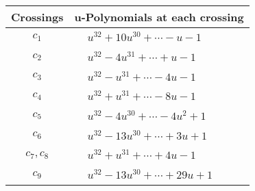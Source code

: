 \documentclass[1p]{elsarticle_modified}
\theoremstyle{definition}
\begin{document}
\begin{tabular}{m{50pt}|m{274pt}}
Crossings & \hspace{64pt}u-Polynomials at each crossing \\
\hline $$\begin{aligned}c_{1}\end{aligned}$$&$\begin{aligned}
&u^{32}+10 u^{30}+\cdots- u-1
\end{aligned}$\\
\hline $$\begin{aligned}c_{2}\end{aligned}$$&$\begin{aligned}
&u^{32}-4 u^{31}+\cdots+u-1
\end{aligned}$\\
\hline $$\begin{aligned}c_{3}\end{aligned}$$&$\begin{aligned}
&u^{32}- u^{31}+\cdots-4 u-1
\end{aligned}$\\
\hline $$\begin{aligned}c_{4}\end{aligned}$$&$\begin{aligned}
&u^{32}+u^{31}+\cdots-8 u-1
\end{aligned}$\\
\hline $$\begin{aligned}c_{5}\end{aligned}$$&$\begin{aligned}
&u^{32}-4 u^{30}+\cdots-4 u^2+1
\end{aligned}$\\
\hline $$\begin{aligned}c_{6}\end{aligned}$$&$\begin{aligned}
&u^{32}-13 u^{30}+\cdots+3 u+1
\end{aligned}$\\
\hline $$\begin{aligned}c_{7},c_{8}\end{aligned}$$&$\begin{aligned}
&u^{32}+u^{31}+\cdots+4 u-1
\end{aligned}$\\
\hline $$\begin{aligned}c_{9}\end{aligned}$$&$\begin{aligned}
&u^{32}-13 u^{30}+\cdots+29 u+1
\end{aligned}$\\

\end{tabular}
\end{document}
